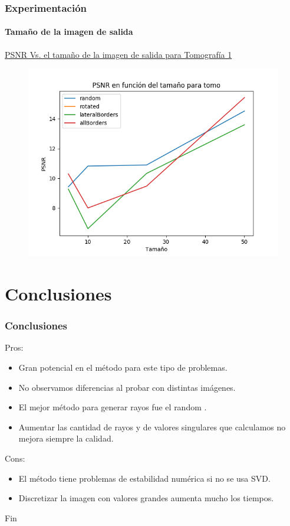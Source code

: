 \documentclass{beamer}
\begin{document}
\begin{frame}
\frametitle{Experimentación}
\framesubtitle{Tamaño de la imagen de salida}
\underline{PSNR Vs. el tamaño de la imagen de salida para Tomografía 1}
\begin{figure}[H]
  \centering
  \includegraphics[height=0.75\textheight]{../graficos/size/tomo/noise_graph.png}
\end{figure}
\end{frame}

\section{Conclusiones}

\begin{frame}
\frametitle{Conclusiones}
Pros:
\begin{itemize}
	\item Gran potencial en el método para este tipo de problemas.
	\item No observamos diferencias al probar con distintas imágenes.
	\item El mejor método para generar rayos fue el random .
	\item Aumentar las cantidad de rayos y de valores singulares que calculamos
		no mejora siempre la calidad.
\end{itemize}

Cons:
\begin{itemize}
	\item El método tiene problemas de estabilidad numérica si no se usa SVD.
	\item Discretizar la imagen con valores grandes aumenta mucho los tiempos.
\end{itemize}
\end{frame}


\begin{frame}
  \Huge{\centerline{Fin}}
\end{frame}
\end{document}
